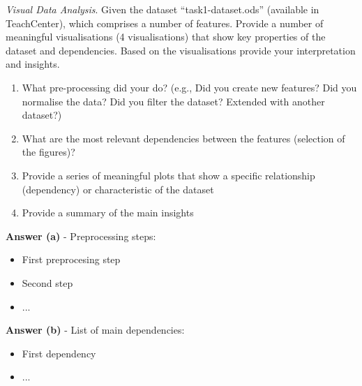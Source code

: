 \documentclass[a4paper,10pt]{article}\setlength{\textheight}{10in}\setlength{\textwidth}{6.5in}\setlength{\topmargin}{-0.125in}\setlength{\oddsidemargin}{-.2in}\setlength{\evensidemargin}{-.2in}\setlength{\headsep}{0.2in}\setlength{\footskip}{0pt}\usepackage{amsmath}\usepackage{fancyhdr}\usepackage{enumitem}\usepackage{hyperref}\usepackage{xcolor}\usepackage{graphicx}\usepackage[export]{adjustbox}\usepackage{caption}\usepackage{float}\usepackage{booktabs}\pagestyle{fancy}
\begin{document}
\begin{enumerate}[topsep=0mm, partopsep=0mm, leftmargin=*]





{\color{blue}
\item\textit{Visual Data Analysis}. Given the dataset ``task1-dataset.ods'' (available in TeachCenter), which comprises a number of features. Provide a number of meaningful visualisations (4 visualisations) that show key properties of the dataset and dependencies. Based on the visualisations provide your interpretation and insights. 
\begin{enumerate}
	\item What pre-processing did your do? (e.g., Did you create new features? Did you normalise the data? Did you filter the dataset? Extended with another dataset?)
	\item What are the most relevant dependencies between the features (selection of the figures)?
	\item Provide a series of meaningful plots that show a specific relationship (dependency) or characteristic of the dataset
	\item Provide a summary of the main insights
\end{enumerate}
}


\textbf{Answer (a)} - Preprocessing steps:
    \begin{itemize}
        \item First preprocesing step
        \item Second step
        \item ...
    \end{itemize}
    
\textbf{Answer (b)} - List of main dependencies:
    \begin{itemize}
        \item First dependency
        \item ...
    \end{itemize}
    

\end{enumerate}
\end{document}
